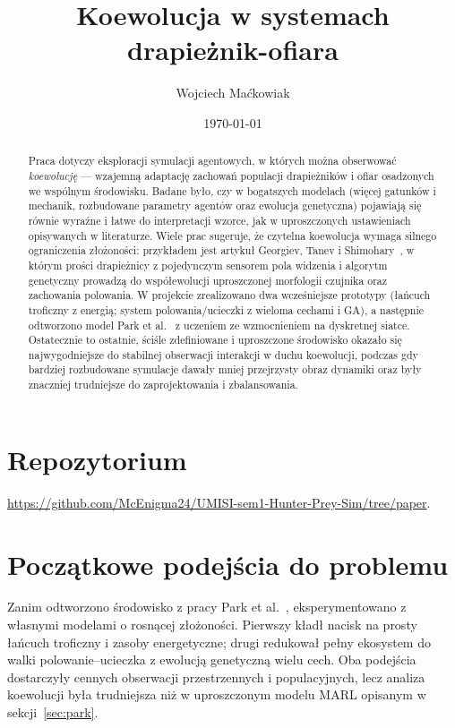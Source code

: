\documentclass[polish]{template/projectreport}
\title{Koewolucja w systemach drapieżnik-ofiara}
\author{Wojciech Maćkowiak}
\date{\today}
\begin{document}
\maketitle

\thispagestyle{empty}

\begin{abstract}
Praca dotyczy eksploracji symulacji agentowych, w których można obserwować \emph{koewolucję} --- wzajemną adaptację zachowań populacji drapieżników i ofiar osadzonych we wspólnym środowisku.
Badane było, czy w bogatszych modelach (więcej gatunków i mechanik, rozbudowane parametry agentów oraz ewolucja genetyczna) pojawiają się równie wyraźne i łatwe do interpretacji wzorce, jak w uproszczonych ustawieniach opisywanych w literaturze.
Wiele prac sugeruje, że czytelna koewolucja wymaga silnego ograniczenia złożoności: przykładem jest artykuł Georgiev, Tanev i Shimohary~\cite{georgiev2019}, w którym prości drapieżnicy z pojedynczym sensorem pola widzenia i algorytm genetyczny prowadzą do współewolucji uproszczonej morfologii czujnika oraz zachowania polowania.
W projekcie zrealizowano dwa wcześniejsze prototypy (łańcuch troficzny z energią; system polowania/ucieczki z wieloma cechami i GA), a następnie odtworzono model Park et al.~\cite{park2021} z uczeniem ze wzmocnieniem na dyskretnej siatce.
Ostatecznie to ostatnie, ściśle zdefiniowane i uproszczone środowisko okazało się najwygodniejsze do stabilnej obserwacji interakcji w duchu koewolucji, podczas gdy bardziej rozbudowane symulacje dawały mniej przejrzysty obraz dynamiki oraz były znaczniej trudniejsze do zaprojektowania i zbalansowania.
\end{abstract}

\section*{Repozytorium}
\url{https://github.com/McEnigma24/UMISI-sem1-Hunter-Prey-Sim/tree/paper}.

\section{Początkowe podejścia do problemu}
\label{sec:inne-podejscia}

Zanim odtworzono środowisko z pracy Park et al.~\cite{park2021}, eksperymentowano z własnymi modelami o rosnącej złożoności.
Pierwszy kładł nacisk na prosty łańcuch troficzny i zasoby energetyczne; drugi redukował pełny ekosystem do walki polowanie--ucieczka z ewolucją genetyczną wielu cech.
Oba podejścia dostarczyły cennych obserwacji przestrzennych i populacyjnych, lecz analiza koewolucji była trudniejsza niż w uproszczonym modelu MARL opisanym w sekcji~\ref{sec:park}.
\end{document}
